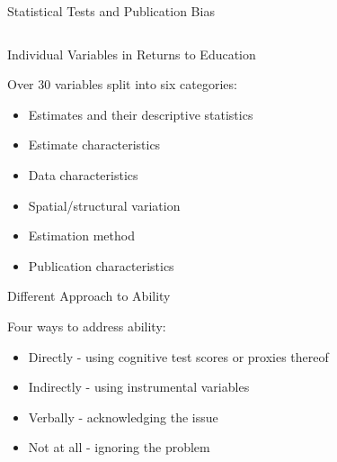 \documentclass{beamer} %
\begin{document}
\begin{frame}{Statistical Tests and Publication Bias}
\begin{tiny}
\begin{table}[!t]
\begin{tabular}{
                @{}l*{6}{c}
                }
                \bottomrule
            \end{tabular}
        \end{table}

    \end{tiny}
\end{frame}






\begin{frame}{Individual Variables in Returns to Education}

    Over 30 variables split into six categories:
    \vspace{0.3cm}

    \begin{itemize}
        \item<1-> Estimates and their descriptive statistics
        \item<2-> Estimate characteristics
        \item<3-> Data characteristics
        \item<4-> Spatial/structural variation
        \item<5-> Estimation method
        \item<6-> Publication characteristics
    \end{itemize}

\end{frame}

\begin{frame}{Different Approach to Ability}

    Four ways to address ability:
    \vspace{0.3cm}

    \begin{itemize}
        \item<1-> Directly - using cognitive test scores or proxies thereof
        \item<2-> Indirectly - using instrumental variables
        \item<3-> Verbally - acknowledging the issue
        \item<4-> Not at all - ignoring the problem
    \end{itemize}

\end{frame}
\end{document}
